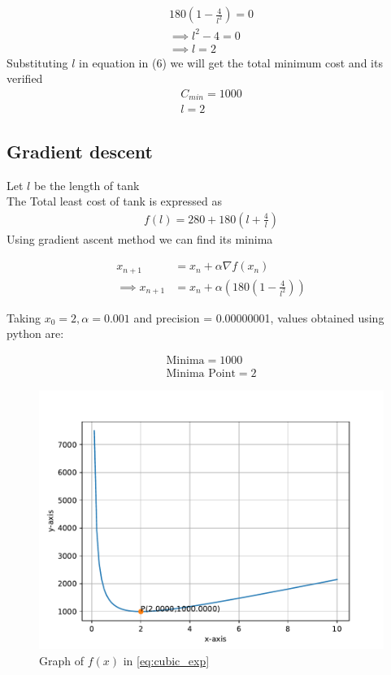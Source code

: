 \documentclass[journal,10pt,twocolumn]{article}
\providecommand{\brak}[1]{\ensuremath{\left(#1\right)}}
\begin{document}
\begin{align}
    180\brak{1-\frac{4}{l^2}}=0\\
    \implies l^2-4=0\\
    \implies l=2
\end{align}
Substituting $l$ in equation in (6) we will get the total minimum cost and its verified 
\begin{align}
	\boxed{C_{min} = 1000}\\
	\boxed{l = 2}
\end{align}

\subsection*{\normalsize Gradient descent}
Let $l$ be the length of tank \\ \vspace{1mm}
The Total least cost of tank is expressed as
\begin{align}
	\label{eq:vol_varx}
	f(l) = 280 + 180\brak{l+\frac{4}{l}}
\end{align}
Using gradient ascent method we can find its minima\\ \vspace{2mm}

    \begin{align}
        x_{n+1} &= x_n + \alpha \nabla f(x_n) \\
        \implies x_{n+1} &= x_n + \alpha \brak{180\brak{1-\frac{4}{l^2}}}
    \end{align}
    
Taking $x_0=2,\alpha=0.001$ and precision = 0.00000001, values obtained using python are:
    
    \begin{align}
        \boxed{\text{Minima} = 1000}\\
        \boxed{\text{Minima Point} = 2}
    \end{align}

\begin{figure}[t]
	\centering
	\includegraphics[width=1\columnwidth]{opt.pdf}
	\caption{Graph of $f(x)$ in \eqref{eq:cubic_exp}}
	\label{fig:graph_fx}
\end{figure}
\end{document}
